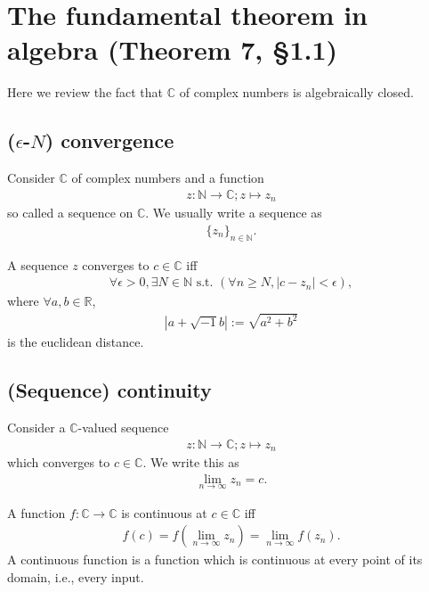\documentclass[11pt]{book}
\begin{document}

\section{The fundamental theorem in algebra (Theorem 7, \S1.1)}
Here we review the fact that $\mathbb{C}$ of complex numbers is algebraically closed.

\subsection{($\epsilon$-$N$) convergence}
Consider $\mathbb{C}$ of complex numbers and a function
\begin{eqnarray}
z: \mathbb{N} \to \mathbb{C}; z\mapsto z_n
\end{eqnarray}
so called a sequence on $\mathbb{C}$.
We usually write a sequence as
\begin{eqnarray}
\{ z_n \}_{n \in \mathbb{N}}.
\end{eqnarray}

A sequence $z$ converges to $c \in \mathbb{C}$ iff
\begin{eqnarray}
\forall \epsilon > 0, \exists N \in \mathbb{N} \text{ s.t. } (\forall n \geq N, |c - z_n| < \epsilon),
\end{eqnarray}
where $\forall a ,b \in \mathbb{R}$,
\begin{eqnarray}
|a + \sqrt{-1} b| :=  \sqrt{a^2 + b^2}
\end{eqnarray}
is the euclidean distance.

\subsection{(Sequence) continuity}
Consider a $\mathbb{C}$-valued sequence
\begin{eqnarray}
z: \mathbb{N} \to \mathbb{C}; z\mapsto z_n
\end{eqnarray}
which converges to $c \in \mathbb{C}$.
We write this as
\begin{eqnarray}
\lim_{n \to \infty} z_n = c.
\end{eqnarray}

A function $f: \mathbb{C} \to \mathbb{C}$ is continuous at $c \in \mathbb{C}$ iff
\begin{eqnarray}
f(c) = f\left( \lim_{n \to \infty} z_n \right) = \lim_{n \to \infty} f(z_n).
\end{eqnarray}
A continuous function is a function which is continuous at every point of its domain, i.e., every input.
\end{document}
